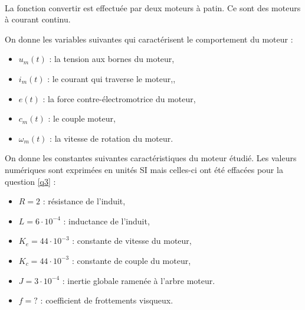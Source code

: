 ~\

La fonction convertir est effectuée par deux moteurs à patin. Ce sont des moteurs à courant continu.

On donne les variables suivantes qui caractérisent le comportement du moteur :
\begin{itemize}
 \item $u_m(t)$ : la tension aux bornes du moteur,
 \item $i_m(t)$ : le courant qui traverse le moteur,,
 \item $e(t)$ : la force contre-électromotrice du moteur,
 \item $c_m(t)$ : le couple moteur,
 \item $\omega_m(t)$ : la vitesse de rotation du moteur.
\end{itemize}

\newpage

On donne les constantes suivantes caractéristiques du moteur étudié. Les valeurs numériques sont exprimées en unités SI mais celles-ci ont été effacées pour la question \ref{q3} :
\begin{itemize}
 \item $R=2$ : résistance de l'induit,
 \item $L=6\cdot 10^{-4}$ : inductance de l'induit,
 \item $K_e=44\cdot 10^{-3}$ : constante de vitesse du moteur,
 \item $K_c=44\cdot 10^{-3}$ : constante de couple du moteur,
 \item $J=3\cdot 10^{-4}$ : inertie globale ramenée à l'arbre moteur.
 \item $f=?$ : coefficient de frottements visqueux.
\end{itemize}







